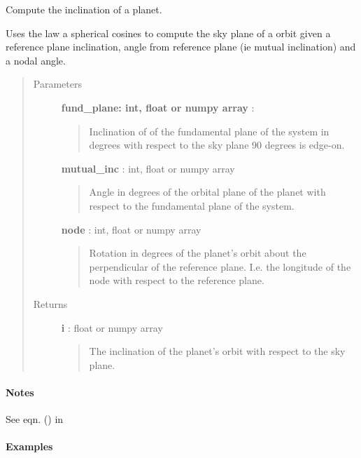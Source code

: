 \documentclass[letterpaper,10pt,english]{sphinxmanual}
\begin{document}

\begin{fulllineitems}
\label{index:simple_lib.inclination}
Compute the inclination of a planet.

Uses the law a spherical cosines to compute the sky plane of a orbit
given a reference plane inclination, angle from reference plane (ie mutual
inclination) and a nodal angle.
\begin{quote}\begin{description}
\item[{Parameters}] \leavevmode
\textbf{fund\_plane: int, float or numpy array} :
\begin{quote}

Inclination of of the fundamental plane of the system in degrees with
respect to the sky plane 90 degrees is edge-on.
\end{quote}

\textbf{mutual\_inc} : int, float or numpy array
\begin{quote}

Angle in degrees of the orbital plane of the planet with respect to the
fundamental plane of the system.
\end{quote}

\textbf{node} : int, float or numpy array
\begin{quote}

Rotation in degrees of the planet's orbit about the perpendicular of
the reference plane. I.e. the longitude of the node with respect to the
reference plane.
\end{quote}

\item[{Returns}] \leavevmode
\textbf{i} : float or numpy array
\begin{quote}

The inclination of the planet's orbit with respect to the sky plane.
\end{quote}

\end{description}\end{quote}
\paragraph{Notes}

See eqn. () in
\paragraph{Examples}


\end{fulllineitems}
\end{document}

